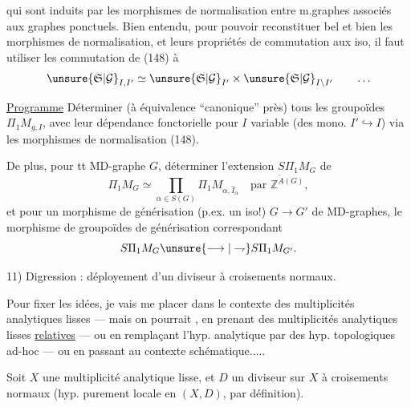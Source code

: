 qui sont induits par les morphismes de normalisation entre m.graphes associés aux graphes ponctuels. Bien entendu, pour pouvoir reconstituer bel et bien les  morphismes de normalisation, et leurs propriétés de commutation aux iso, il faut utiliser les  commutation de (148) à
\[
\unsure{\mathfrak S|\mathcal G}_{I,I'}\simeq\unsure{\mathfrak S|\mathcal G}_{I'}\times\unsure{\mathfrak S|\mathcal G}_{I\setminus I'}\qquad\ldots
\]

\uline{Programme} Déterminer (à équivalence ``canonique'' près) tous les groupoïdes $\Pi_1M_{g,I}$, avec leur dépendance fonctorielle pour  $I$ variable (des mono. $I'\hookrightarrow I$) via les morphismes de normalisation (148).

De plus, pour tt MD-graphe $G$, déterminer l'extension $S\Pi_1M_G$ de
\[
\Pi_1M_G\simeq\prod_{\alpha\in S(G)}\Pi_1M_{\alpha,\widehat I_\alpha}\quad\text{par }\mathbb Z^{\widetilde A(G)},
\]
et pour un morphisme de générisation (p.ex. un iso!)  $G\longrightarrow G'$ de MD-graphes,  le morphisme de groupoïdes de générisation correspondant
\[
S\Pi_1M_G\unsure{\longrightarrow|\rightharpoondown}S\Pi_1M_{G'}.
\]

11) Digression : déployement d'un diviseur à croisements normaux.

Pour fixer les idées, je vais me placer dans le contexte des multiplicités analytiques lisses — mais on pourrait , en prenant des multiplicités analytiques lisses \uline{relatives} — ou en remplaçant l'hyp. analytique par des hyp. topologiques ad-hoc — ou en passant au contexte schématique.....

Soit $X$ une multiplicité analytique lisse, et $D$ un diviseur sur $X$ à croisements normaux (hyp. purement locale en $(X,D)$, par définition). 

